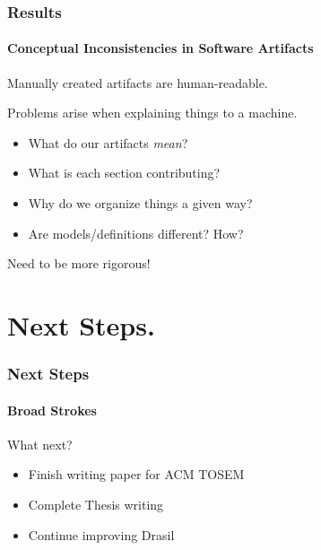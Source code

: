 \documentclass{beamer}
\begin{document}

\begin{frame}

\frametitle{Results} %
\framesubtitle{Conceptual Inconsistencies in Software Artifacts}

Manually created artifacts are human-readable.

Problems arise when explaining things to a machine.

\begin{itemize}
\item What do our artifacts \emph{mean}?
\item What is each section contributing? %
\item Why do we organize things a given way?
\item Are models/definitions different? How?
\end{itemize}

Need to be more rigorous!

\end{frame}


\section[Next Steps]{Next Steps.}


\begin{frame}

\frametitle{Next Steps}
\framesubtitle{Broad Strokes}


\begin{Large}
What next?
\end{Large}

\begin{itemize}
\item Finish writing paper for ACM TOSEM
\item Complete Thesis writing
\item Continue improving Drasil %
\end{itemize}
\end{frame}

\end{document}
